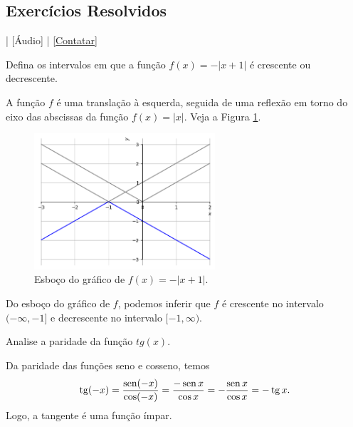 \subsection*{Exercícios Resolvidos}

\begin{flushright}
  [Vídeo] | [Áudio] | \href{https://phkonzen.github.io/notas/contato.html}{[Contatar]}
\end{flushright}

\begin{exeresol}
  Defina os intervalos em que a função $f(x) = -|x+1|$ é crescente ou decrescente.
\end{exeresol}
\begin{resol}
  A função $f$ é uma translação à esquerda, seguida de uma reflexão em torno do eixo das abscissas da função $f(x) = |x|$. Veja a Figura \ref{fig:exeresol_funprop_mono}.

  \begin{figure}[H]
    \centering
    \includegraphics[width=0.6\textwidth]{./cap_funcao/dados/fig_exeresol_funprop_mono/fig_exeresol_funprop_mono.png}
    \caption{Esboço do gráfico de $f(x) = -|x+1|$.}
    \label{fig:exeresol_funprop_mono}
  \end{figure}

  Do esboço do gráfico de $f$, podemos inferir que $f$ é crescente no intervalo $(-\infty, -1]$ e decrescente no intervalo $[-1, \infty)$.
\end{resol}

\begin{exeresol}
  Analise a paridade da função $tg(x)$.
\end{exeresol}
\begin{resol}
  Da paridade das funções seno e cosseno, temos
  \begin{equation}
    \operatorname{tg}(-x) = \frac{\operatorname{sen}(-x)}{\cos(-x)} = \frac{-\operatorname{sen} x}{\cos x} = -\frac{\operatorname{sen} x}{\cos x} = -\operatorname{tg} x.
  \end{equation}
  Logo, a tangente é uma função ímpar.
\end{resol}

